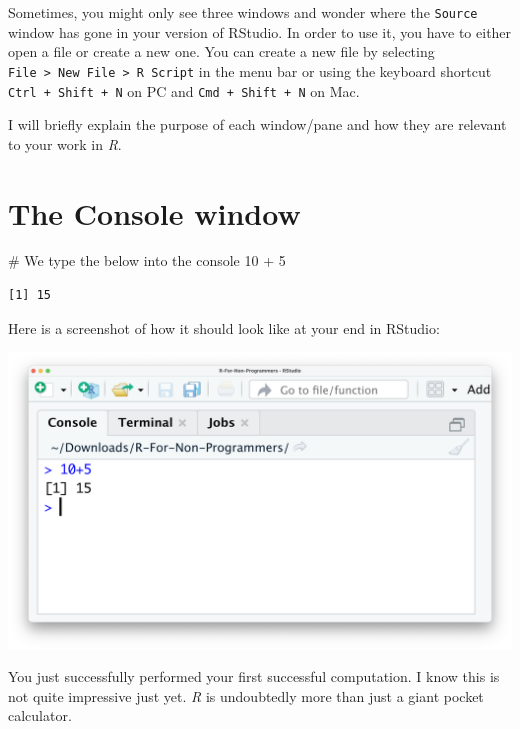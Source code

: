 \documentclass[
  letterpaper,
  DIV=11,
  numbers=noendperiod]{scrreprt}
\newenvironment{Shaded}{\begin{snugshade}}{\end{snugshade}}
\newcommand{\CommentTok}[1]{\textcolor[rgb]{0.37,0.37,0.37}{#1}}
\newcommand{\DecValTok}[1]{\textcolor[rgb]{0.68,0.00,0.00}{#1}}
\newcommand{\SpecialCharTok}[1]{\textcolor[rgb]{0.37,0.37,0.37}{#1}}
\begin{document}
Sometimes, you might only see three windows and wonder where the
\texttt{Source} window has gone in your version of RStudio. In order to
use it, you have to either open a file or create a new one. You can
create a new file by selecting
\texttt{File\ \textgreater{}\ New\ File\ \textgreater{}\ R\ Script} in
the menu bar or using the keyboard shortcut
\texttt{Ctrl\ +\ Shift\ +\ N} on PC and \texttt{Cmd\ +\ Shift\ +\ N} on
Mac.

I will briefly explain the purpose of each window/pane and how they are
relevant to your work in \emph{R}.

\section{The Console window}\label{sec-the-console-window}

\begin{Shaded}
\begin{Highlighting}[]
\CommentTok{\# We type the below into the console}
\DecValTok{10} \SpecialCharTok{+} \DecValTok{5}
\end{Highlighting}
\end{Shaded}

\begin{verbatim}
[1] 15
\end{verbatim}

Here is a screenshot of how it should look like at your end in RStudio:

\includegraphics{images/chapter_04_img/02_console_window/console_algebra.png}

You just successfully performed your first successful computation. I
know this is not quite impressive just yet. \emph{R} is undoubtedly more
than just a giant pocket calculator.
\end{document}
